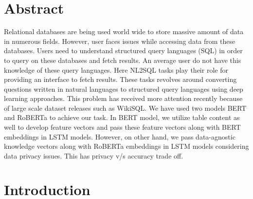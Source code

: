 \documentclass[12pt]{article}
\begin{document}
\section{Abstract}
Relational databases are being used world wide to store massive amount of data in numerous fields. However, user faces issues while accessing data from these databases. Users need to understand structured query languages (SQL) in order to query on these databases and fetch results. An average user do not have this knowledge of these query languages. Here NL2SQL tasks play their role for providing an interface to fetch results. These tasks revolves around converting questions written in natural languages to structured query languages using deep learning approaches. This problem has received more attention recently because of large scale dataset releases such as WikiSQL. We have used two models BERT and RoBERTa to achieve our task. In BERT model, we utilize table content as well to develop feature vectors and pass these feature vectors along with BERT embeddings in LSTM models. However, on other hand, we pass data-agnostic knowledge vectors along with RoBERTa embeddings in LSTM models considering data privacy issues. This has privacy v/s accuracy trade off. 


\newpage

\section{Introduction}
\end{document}
